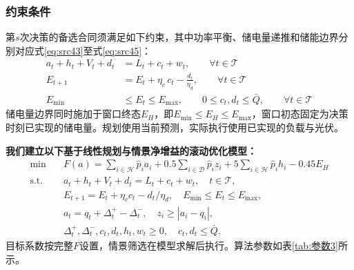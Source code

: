 \subsubsection{约束条件}

第$s$次决策的备选合同须满足如下约束，其中功率平衡、储电量递推和储能边界分别对应式\eqref{eq:src43}至式\eqref{eq:src45}：
\begin{align}
    a_{t}+h_{t}+V_{t}+d_{t}&=L_{t}+c_{t}+w_{t},\qquad \forall t\in\mathcal{T}\label{eq:src43}\\
    E_{t+1}&=E_{t}+\eta_{c}\,c_{t}-\frac{d_{t}}{\eta_{d}},\qquad \forall t\in\mathcal{T}\label{eq:src44}\\
    E_{\min}&\le E_{t}\le E_{\max},\qquad 0\le c_{t},d_{t}\le \bar{Q},\qquad \forall t\in\mathcal{T}
\label{eq:src45}\end{align}
储电量边界同时施加于窗口终态$E_H$，即$E_{\min}\le E_H\le E_{\max}$，窗口初态固定为决策时刻已实现的储电量。规划使用当前预测，实际执行使用已实现的负载与光伏。


\textbf{我们建立以下基于线性规划与情景净增益的滚动优化模型：}
\begin{equation}\label{eq:src46}
    \begin{aligned}
    \min\quad &F(a)=\sum_{i\in\mathcal H}\hat p_i a_i+0.5\sum_{i\in\mathcal D}\hat p_i z_i+5\sum_{i\in\mathcal H}\hat p_i h_i-0.45E_H\\
    \mathrm{s.t.}\quad &a_t+h_t+V_t+d_t=L_t+c_t+w_t,\quad t\in\mathcal T,\\
    &E_{t+1}=E_t+\eta_c c_t-d_t/\eta_d,\quad E_{\min}\le E_t\le E_{\max},\\
    &a_t=q_t+\Delta_t^+-\Delta_t^-,\quad z_i\ge|a_i-q_i|,\\
    &\Delta_t^+,\Delta_t^-,c_t,d_t,h_t,w_t\ge0,\quad c_t,d_t\le\bar Q.
    \end{aligned}
\end{equation}
目标系数按完整$F$设置，情景筛选在模型求解后执行。算法参数如表\ref{tab:参数3}所示。

